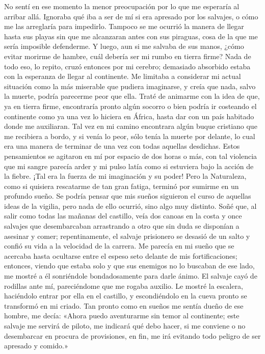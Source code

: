 \documentclass{novela}
\begin{document}
    No sentí en ese momento la menor preocupación por lo que me esperaría al arribar allá. Ignoraba qué iba a ser de mí si era apresado por los salvajes, o cómo me las arreglaría para impedirlo. Tampoco se me ocurrió la manera de llegar hasta sus playas sin que me alcanzaran antes con sus piraguas, cosa de la que me sería imposible defenderme. Y luego, aun si me salvaba de sus manos, ¿cómo evitar morirme de hambre, cuál debería ser mi rumbo en tierra firme? Nada de todo eso, lo repito, cruzó entonces por mi cerebro; demasiado absorbido estaba con la esperanza de llegar al continente. Me limitaba a considerar mi actual situación como la más miserable que pudiera imaginarse, y creía que nada, salvo la muerte, podría parecerme peor que ella. Traté de animarme con la idea de que, ya en tierra firme, encontraría pronto algún socorro o bien podría ir costeando el continente como ya una vez lo hiciera en África, hasta dar con un país habitado donde me auxiliaran. Tal vez en mi camino encontrara algún buque cristiano que me recibiera a bordo, y si venía lo peor, sólo tenía la muerte por delante, lo cual era una manera de terminar de una vez con todas aquellas desdichas.
    Estos pensamientos se agitaron en mí por espacio de dos horas o más, con tal violencia que mi sangre parecía arder y mi pulso latía como si estuviera bajo la acción de la fiebre. ¡Tal era la fuerza de mi imaginación y su poder! Pero la Naturaleza, como si quisiera rescatarme de tan gran fatiga, terminó por sumirme en un profundo sueño. Se podría pensar que mis sueños siguieron el curso de aquellas ideas de la vigilia, pero nada de ello ocurrió, sino algo muy distinto.
    Soñé que, al salir como todas las mañanas del castillo, veía dos canoas en la costa y once salvajes que desembarcaban arrastrando a otro que sin duda se disponían a asesinar y comer; repentinamente, el salvaje prisionero se desasió de un salto y confió su vida a la velocidad de la carrera. Me parecía en mi sueño que se acercaba hasta ocultarse entre el espeso seto delante de mis fortificaciones; entonces, viendo que estaba solo y que sus enemigos no lo buscaban de ese lado, me mostré a él sonriéndole bondadosamente para darle ánimo. El salvaje cayó de rodillas ante mí, pareciéndome que me rogaba auxilio. Le mostré la escalera, haciéndolo entrar por ella en el castillo, y escondiéndolo en la cueva pronto se transformó en mi criado. Tan pronto como en sueños me sentía dueño de ese hombre, me decía: «Ahora puedo aventurarme sin temor al continente; este salvaje me servirá de piloto, me indicará qué debo hacer, si me conviene o no desembarcar en procura de provisiones, en fin, me irá evitando todo peligro de ser apresado y comido.»
\end{document}
